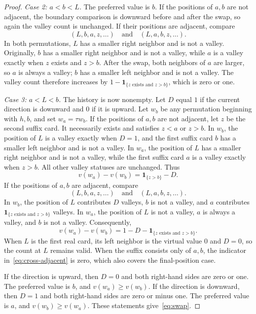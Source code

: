 \documentclass[11pt,reqno]{amsart}
\numberwithin{equation}{section}
\theoremstyle{definition}
\theoremstyle{remark}
\begin{document}
\begin{proof}
\emph{Case 2: $a<b<L$.}
The preferred value is $b$. If the positions of $a,b$ are not adjacent, the boundary comparison is downward before and after the swap, so again the valley count is unchanged. If their positions are adjacent, compare
\[
 (L,b,a,z,\ldots)\quad\text{and}\quad(L,a,b,z,\ldots).
\]
In both permutations, $L$ has a smaller right neighbor and is not a valley. Originally, $b$ has a smaller right neighbor and is not a valley, while $a$ is a valley exactly when $z$ exists and $z>b$. After the swap, both neighbors of $a$ are larger, so $a$ is always a valley; $b$ has a smaller left neighbor and is not a valley. The valley count therefore increases by $1-\mathbf1_{\{z\text{ exists and }z>b\}}$, which is zero or one.

\emph{Case 3: $a<L<b$.}
The history is now nonempty. Let $D$ equal $1$ if the current direction is downward and $0$ if it is upward. Let $w_b$ be any permutation beginning with $h,b$, and set $w_a=\tau w_b$. If the positions of $a,b$ are not adjacent, let $z$ be the second suffix card. It necessarily exists and satisfies $z<a$ or $z>b$. In $w_b$, the position of $L$ is a valley exactly when $D=1$, and the first suffix card $b$ has a smaller left neighbor and is not a valley. In $w_a$, the position of $L$ has a smaller right neighbor and is not a valley, while the first suffix card $a$ is a valley exactly when $z>b$. All other valley statuses are unchanged. Thus
\begin{equation}\label{eq:cross-separated}
 v(w_a)-v(w_b)=\mathbf1_{\{z>b\}}-D.
\end{equation}
If the positions of $a,b$ are adjacent, compare
\[
 (L,b,a,z,\ldots)\quad\text{and}\quad(L,a,b,z,\ldots).
\]
In $w_b$, the position of $L$ contributes $D$ valleys, $b$ is not a valley, and $a$ contributes $\mathbf1_{\{z\text{ exists and }z>b\}}$ valleys. In $w_a$, the position of $L$ is not a valley, $a$ is always a valley, and $b$ is not a valley. Consequently,
\begin{equation}\label{eq:cross-adjacent}
 v(w_a)-v(w_b)=1-D-\mathbf1_{\{z\text{ exists and }z>b\}}.
\end{equation}
When $L$ is the first real card, its left neighbor is the virtual value $0$ and $D=0$, so the count at $L$ remains valid. When the suffix consists only of $a,b$, the indicator in~\eqref{eq:cross-adjacent} is zero, which also covers the final-position case.

If the direction is upward, then $D=0$ and both right-hand sides are zero or one. The preferred value is $b$, and $v(w_a)\ge v(w_b)$. If the direction is downward, then $D=1$ and both right-hand sides are zero or minus one. The preferred value is $a$, and $v(w_b)\ge v(w_a)$. These statements give~\eqref{eq:swap}.
\end{proof}
\end{document}

